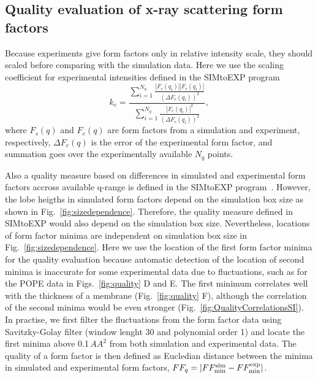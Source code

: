 \documentclass[fleqn,10pt]{wlscirep}
\begin{document}
\subsection{Quality evaluation of x-ray scattering form factors}
Because experiments give form factors only in relative intensity scale, they should scaled before comparing with the simulation data. Here we use the scaling coefficient for experimental intensities defined in the SIMtoEXP program~\cite{kucerka10}
\begin{equation}
    k_e = \frac{\sum_{i=1}^{N_q} \frac{|F_s(q_i)||F_e(q_i)|}{(\Delta F_e(q_i))^2}}{\sum_{i=1}^{N_q} \frac{|F_e(q_i)|^2}{(\Delta F_e(q_i))^2}},
\end{equation}
where $F_s(q)$ and $F_e(q)$ are form factors from a simulation and experiment, respectively, $\Delta F_e(q)$ is the error of the experimental form factor, and summation goes over the experimentally available $N_q$ points. 

Also a quality measure based on differences in simulated and experimental form factors accross available q-range is defined in the SIMtoEXP program~\cite{kucerka10}. However, the lobe heigths in simulated form factors depend on the simulation box size as shown in Fig.~\ref{fig:sizedependence}. Therefore, the quality measure defined in SIMtoEXP  would also depend on the simulation box size. Nevertheless, locations of form factor minima are independent on simulation box size in Fig.~\ref{fig:sizedependence}. Here we use the location of the first form factor minima for the quality evaluation because automatic detection of the location of second minima is inaccurate for some experimental data due to fluctuations, such as for the POPE data in Figs.~\ref{fig:quality} D and E. 
The first minimum correlates well with the thickness of a membrane (Fig.~\ref{fig:quality} F), although the correlation of the second minima would be even stronger (Fig.~\ref{fig:QualityCorrelationsSI}). In practise, we first filter the fluctuations from the form factor data using Savitzky-Golay filter (window lenght 30 and polynomial order 1) and locate the first minima above 0.1\,$AA^2$ from both simulation and experimental data. The quality of a form factor is then defined as Eucledian distance between the minima in simulated and experimental form factors, $FF_q = |FF_{\rm{min}}^{\rm{sim}}-FF_{\rm{min}}^{\rm{exp}}|$. 
\end{document}
